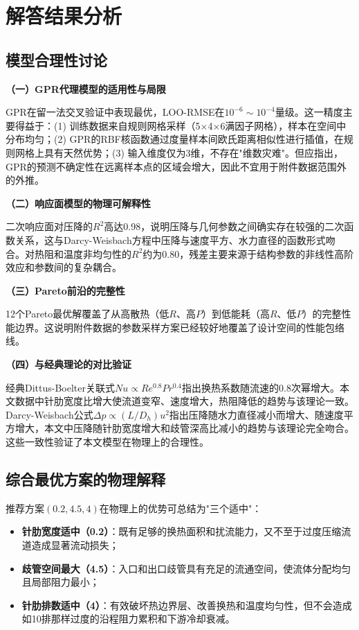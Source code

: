 \documentclass[12pt,a4paper]{ctexart}
\begin{document}
\section{解答结果分析}

\subsection{模型合理性讨论}

\textbf{（一）GPR代理模型的适用性与局限}

GPR在留一法交叉验证中表现最优，LOO-RMSE在$10^{-6}\sim 10^{-4}$量级。这一精度主要得益于：(1) 训练数据来自规则网格采样（5$\times$4$\times$6满因子网格），样本在空间中分布均匀；(2) GPR的RBF核函数通过度量样本间欧氏距离相似性进行插值，在规则网格上具有天然优势；(3) 输入维度仅为3维，不存在"维数灾难"。但应指出，GPR的预测不确定性在远离样本点的区域会增大，因此不宜用于附件数据范围外的外推。

\textbf{（二）响应面模型的物理可解释性}

二次响应面对压降的$R^2$高达0.98，说明压降与几何参数之间确实存在较强的二次函数关系，这与Darcy-Weisbach方程中压降与速度平方、水力直径的函数形式吻合。对热阻和温度非均匀性的$R^2$约为0.80，残差主要来源于结构参数的非线性高阶效应和参数间的复杂耦合。

\textbf{（三）Pareto前沿的完整性}

12个Pareto最优解覆盖了从高散热（低$R$、高$P$）到低能耗（高$R$、低$P$）的完整性能边界。这说明附件数据的参数采样方案已经较好地覆盖了设计空间的性能包络线。

\textbf{（四）与经典理论的对比验证}

经典Dittus-Boelter关联式$Nu \propto Re^{0.8}Pr^{0.4}$指出换热系数随流速的0.8次幂增大。本文数据中针肋宽度比增大使流道变窄、速度增大，热阻降低的趋势与该理论一致。Darcy-Weisbach公式$\Delta p \propto (L/D_h)u^2$指出压降随水力直径减小而增大、随速度平方增大，本文中压降随针肋宽度增大和歧管深高比减小的趋势与该理论完全吻合。这些一致性验证了本文模型在物理上的合理性。

\subsection{综合最优方案的物理解释}

推荐方案$(0.2, 4.5, 4)$在物理上的优势可总结为"三个适中"：

\begin{itemize}
\item \textbf{针肋宽度适中（0.2）}：既有足够的换热面积和扰流能力，又不至于过度压缩流道造成显著流动损失；
\item \textbf{歧管空间最大（4.5）}：入口和出口歧管具有充足的流通空间，使流体分配均匀且局部阻力最小；
\item \textbf{针肋排数适中（4）}：有效破坏热边界层、改善换热和温度均匀性，但不会造成如10排那样过度的沿程阻力累积和下游冷却衰减。
\end{itemize}
\end{document}
